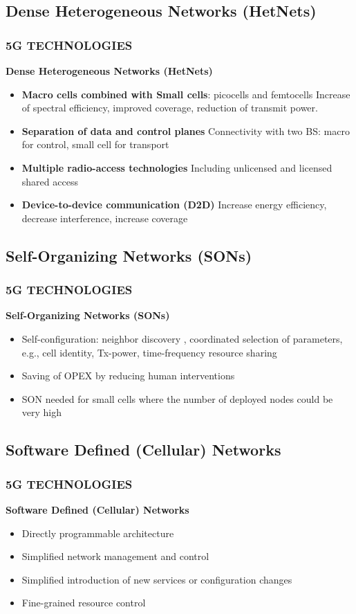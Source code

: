 \documentclass{beamer}
\begin{document}
\subsection{Dense Heterogeneous Networks (HetNets)}
\begin{frame}
\frametitle{5G TECHNOLOGIES}
\textbf{Dense Heterogeneous Networks (HetNets)}
\begin{itemize}
\item \textbf{Macro cells combined with Small cells}: picocells and femtocells
	Increase of spectral efficiency, improved coverage, reduction of transmit power.
\item \textbf{Separation of data and control planes}
	Connectivity with two BS: macro for control, small cell for transport
\item \textbf{Multiple radio-access technologies}
	Including unlicensed and licensed shared access
\item \textbf{Device-to-device communication (D2D)}
	Increase energy efficiency, decrease interference, increase coverage

\end{itemize}
\end{frame}

\subsection{Self-Organizing Networks (SONs)}
\begin{frame}
\frametitle{5G TECHNOLOGIES}
\textbf{Self-Organizing Networks (SONs)}
\begin{itemize}
\item Self-configuration: neighbor discovery , coordinated selection of parameters, e.g., cell identity, Tx-power, time-frequency resource sharing
\item Saving of OPEX by reducing human interventions
\item SON needed for small cells where the number of deployed nodes could be very high

\end{itemize}
\end{frame}

\subsection{Software Defined (Cellular) Networks}
\begin{frame}
\frametitle{5G TECHNOLOGIES}
\textbf{Software Defined (Cellular) Networks}
\begin{itemize}
\item Directly programmable architecture
\item Simplified network management and control
\item Simplified introduction of new services or configuration changes
\item Fine-grained resource control

\end{itemize}
\end{frame}
\end{document}
